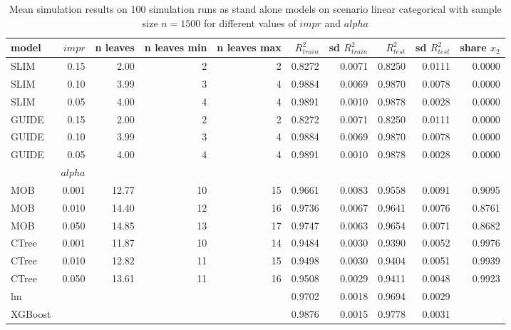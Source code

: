 \begin{table}[!htb]

\centering \tiny
\begin{tabular}[t]{l|r|r|r|r|r|r|r|r|r}
\hline
model & $impr$  & n leaves & n leaves min & n leaves max & $R^2_{train}$ & sd $R^2_{train}$ & $R^2_{test}$ & sd $R^2_{test}$ & share $x_2$\\
\hline

\hline
SLIM & 0.15 & 2.00 & 2 & 2 & 0.8272 & 0.0071 & 0.8250 & 0.0111 & 0.0000\\
SLIM & 0.10 & 3.99 & 3 & 4 & 0.9884 & 0.0069 & 0.9870 & 0.0078 & 0.0000\\
SLIM & 0.05 & 4.00 & 4 & 4 & 0.9891 & 0.0010 & 0.9878 & 0.0028 & 0.0000\\
GUIDE & 0.15 & 2.00 & 2 & 2 & 0.8272 & 0.0071 & 0.8250 & 0.0111 & 0.0000\\
GUIDE & 0.10 & 3.99 & 3 & 4 & 0.9884 & 0.0069 & 0.9870 & 0.0078 & 0.0000\\
GUIDE & 0.05 & 4.00 & 4 & 4 & 0.9891 & 0.0010 & 0.9878 & 0.0028 & 0.0000\\
\hline

  & $alpha$ & & & & & & & & \\
\hline
MOB & 0.001 & 12.77 & 10 & 15 & 0.9661 & 0.0083 & 0.9558 & 0.0091 & 0.9095\\
MOB & 0.010 & 14.40 & 12 & 16 & 0.9736 & 0.0067 & 0.9641 & 0.0076 & 0.8761\\
MOB & 0.050 & 14.85 & 13 & 17 & 0.9747 & 0.0063 & 0.9654 & 0.0071 & 0.8682\\
CTree & 0.001 & 11.87 & 10 & 14 & 0.9484 & 0.0030 & 0.9390 & 0.0052 & 0.9976\\
CTree & 0.010 & 12.82 & 11 & 15 & 0.9498 & 0.0030 & 0.9404 & 0.0051 & 0.9939\\
CTree & 0.050 & 13.61 & 11 & 16 & 0.9508 & 0.0029 & 0.9411 & 0.0048 & 0.9923\\
\hline
lm & & & & & 0.9702 & 0.0018 & 0.9694 & 0.0029 &\\
XGBoost & & & & & 0.9876 & 0.0015 & 0.9778 & 0.0031 & \\
\hline

\end{tabular}
\caption{Mean simulation results on 100 simulation runs as stand alone models on scenario linear categorical with sample size $n = 1500$ for different values of $impr$ and $alpha$}
\label{tab:linear_abrupt_summary} 
\end{table}



